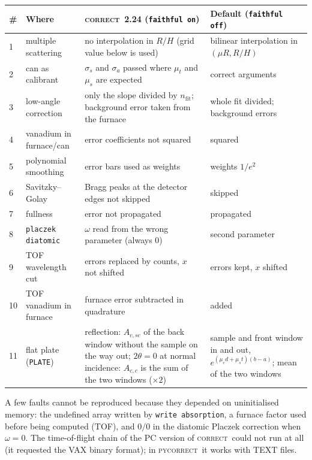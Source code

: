 \documentclass[11pt,a4paper]{report}
\newcommand{\cmd}[1]{\texttt{\color{accent}#1}}
\newcommand{\code}[1]{\texttt{#1}}
\newcommand{\pyc}{\textsc{pycorrect}}
\newcommand{\cor}{\textsc{correct}}
\begin{document}
\begin{longtable}{@{}p{0.5cm} >{\raggedright\arraybackslash}p{3.2cm} >{\raggedright\arraybackslash}p{5.4cm} >{\raggedright\arraybackslash}p{5.4cm}@{}}
\toprule
\# & Where & \cor\ 2.24 (\code{faithful on}) & Default (\code{faithful off}) \\
\midrule
\endhead
1 & multiple scattering & no interpolation in $R/H$ (grid value below is used) & bilinear interpolation in $(\mu R, R/H)$ \\
2 & can as calibrant & $\sigma_s$ and $\sigma_a$ passed where $\mu_t$ and $\mu_s$ are expected & correct arguments \\
3 & low-angle correction & only the slope divided by $n_{\text{fit}}$; background error taken from the furnace & whole fit divided; background errors \\
4 & vanadium in furnace/can & error coefficients not squared & squared \\
5 & polynomial smoothing & error bars used as weights & weights $1/e^2$ \\
6 & Savitzky--Golay & Bragg peaks at the detector edges not skipped & skipped \\
7 & fullness & error not propagated & propagated \\
8 & \cmd{placzek diatomic} & $\omega$ read from the wrong parameter (always 0) & second parameter \\
9 & TOF wavelength cut & errors replaced by counts, $x$ not shifted & errors kept, $x$ shifted \\
10 & TOF vanadium in furnace & furnace error subtracted in quadrature & added \\
11 & flat plate (\code{PLATE}) & reflection: $A_{c,sc}$ of the back window without the sample on the way out; $2\theta=0$ at normal incidence: $A_{c,c}$ is the sum of the two windows ($\times 2$) & sample and front window in and out, $e^{(\mu_c d+\mu_s t)(b-a)}$; mean of the two windows \\
\bottomrule
\end{longtable}

\begin{warn}
A few faults cannot be reproduced because they depended on uninitialised memory:
the undefined array written by \cmd{write absorption}, a furnace factor used
before being computed (TOF), and $0/0$ in the diatomic Placzek correction when
$\omega=0$. The time-of-flight chain of the PC version of \cor\ could not run at
all (it requested the VAX binary format); in \pyc\ it works with TEXT files.
\end{warn}
\end{document}
